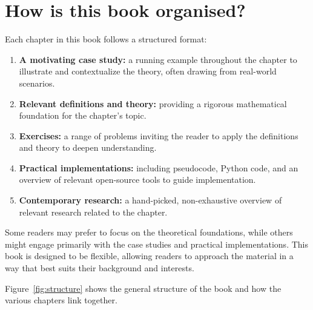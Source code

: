 \section{How is this book organised?}

Each chapter in this book follows a structured format:

\begin{enumerate}
    \item  \textbf{A motivating case study:} a running example throughout the chapter to 
        illustrate and contextualize the theory, often drawing from real-world scenarios.
    \item  \textbf{Relevant definitions and theory:} providing a rigorous mathematical 
        foundation for the chapter’s topic.
    \item  \textbf{Exercises:} a range of problems inviting the reader to apply the definitions 
        and theory to deepen understanding.
    \item  \textbf{Practical implementations:} including pseudocode, Python code, and an 
        overview of relevant open-source tools to guide implementation.
    \item  \textbf{Contemporary research:} a hand-picked, non-exhaustive overview of 
        relevant research related to the chapter.
\end{enumerate}

Some readers may prefer to focus on the theoretical foundations, while others
might engage primarily with the case studies and practical implementations. This
book is designed to be flexible, allowing readers to approach the material in a
way that best suits their background and interests.

Figure~\ref{fig:structure} shows the general structure of the book and how the
various chapters link together.

